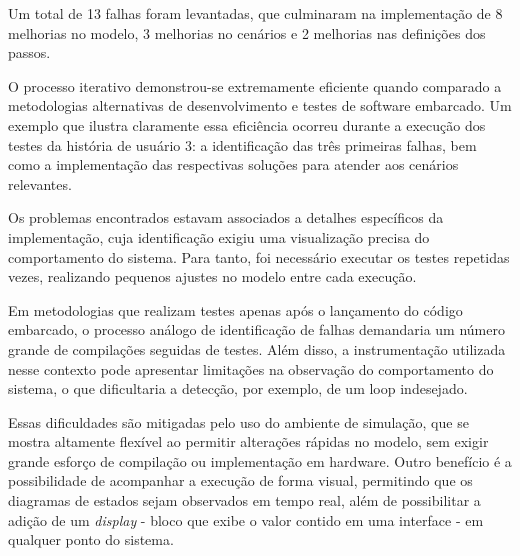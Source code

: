 Um total de 13 falhas foram levantadas, que culminaram na implementação de 8 melhorias no modelo, 3 melhorias no cenários e 2 melhorias nas definições dos passos. 

O processo iterativo demonstrou-se extremamente eficiente quando comparado a metodologias alternativas de desenvolvimento e testes de software embarcado. Um exemplo 
que ilustra claramente essa eficiência ocorreu durante a execução dos testes da história de usuário 3: a identificação das três primeiras falhas, bem como a implementação 
das respectivas soluções para atender aos cenários relevantes.

Os problemas encontrados estavam associados a detalhes específicos da implementação, cuja identificação exigiu uma visualização precisa do comportamento do sistema. 
Para tanto, foi necessário executar os testes repetidas vezes, realizando pequenos ajustes no modelo entre cada execução.

Em metodologias que realizam testes apenas após o lançamento do código embarcado, o processo análogo de identificação de falhas demandaria um número grande de 
compilações seguidas de testes. Além disso, a instrumentação utilizada nesse contexto pode apresentar limitações na observação do comportamento do sistema, o que 
dificultaria a detecção, por exemplo, de um loop indesejado.

Essas dificuldades são mitigadas pelo uso do ambiente de simulação, que se mostra altamente flexível ao permitir alterações rápidas no modelo, sem exigir grande 
esforço de compilação ou implementação em hardware. Outro benefício é a possibilidade de acompanhar a execução de forma visual, permitindo que os diagramas de 
estados sejam observados em tempo real, além de possibilitar a adição de um \textit{display} - bloco que exibe o valor contido em uma interface - em qualquer 
ponto do sistema.
